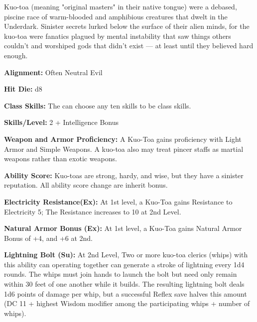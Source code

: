 
Kuo-toa (meaning "original masters" in their native tongue) were a debased, piscine race of warm-blooded and amphibious creatures that dwelt in the Underdark. Sinister secrets lurked below the surface of their alien minds, for the kuo-toa were fanatics plagued by mental instability that saw things others couldn't and worshiped gods that didn't exist — at least until they believed hard enough.

\textbf{Alignment:} Often Neutral Evil

\textbf{Hit Die:} d8

\textbf{Class Skills:} The \currentclassname{} can choose any ten skills to be class skills.

\textbf{Skills/Level:} 2 + Intelligence Bonus

\goodbab{}
\poorfor{}
\goodref{}
\goodwil{}

\begin{classtable}
\end{classtable}

\classfeatures

\textbf{Weapon and Armor Proficiency:} A Kuo-Toa gains proficiency with Light Armor and Simple Weapons. A kuo-toa also may treat pincer staffs as martial weapons rather than exotic weapons.

\textbf{Ability Score:} Kuo-toas are strong, hardy, and wise, but they have a sinister reputation. All ability score change are inherit bonus.
 
 \textbf{Electricity Resistance(Ex):} At 1st level, a Kuo-Toa gains Resistance to Electricity 5; The Resistance increases to 10 at 2nd Level.
 
 \textbf{Natural Armor Bonus (Ex):} At 1st level, a Kuo-Toa gains Natural Armor Bonus of +4, and +6 at 2nd.
 
\textbf{Lightning Bolt (Su):} At 2nd Level, Two or more kuo-toa clerics (whips) with this ability can operating together can generate a stroke of lightning every 1d4 rounds. The whips must join hands to launch the bolt but need only remain within 30 feet of one another while it builds. The resulting lightning bolt deals 1d6 points of damage per whip, but a successful Reflex save halves this amount (DC 11 + highest Wisdom modifier among the participating whips + number of whips).